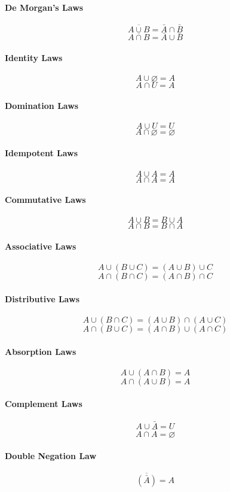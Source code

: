 \documentclass[a4paper, 10pt]{article}
\begin{document}
\begin{multicols}{2}
    \paragraph{De Morgan's Laws}
    \[ \overline{A\cup B} = \bar{A}\cap\bar{B} \]
    \[ \overline{A\cap B} = \bar{A}\cup\bar{B} \]

    \paragraph{Identity Laws}
    \[ A\cup\varnothing = A \]
    \[ A\cap U = A \]

    \paragraph{Domination Laws}
    \[ A\cup U = U \]
    \[ A\cap\varnothing = \varnothing \]

    \paragraph{Idempotent Laws}
    \[ A\cup A = A \]
    \[ A\cap A = A \]

    \paragraph{Commutative Laws}
    \[ A\cup B = B\cup A \]
    \[ A\cap B = B\cap A \]

    \paragraph{Associative Laws}
    \[ A\cup(B\cup C) = (A\cup B)\cup C \]
    \[ A\cap(B\cap C) = (A\cap B)\cap C \]

    \paragraph{Distributive Laws}
    \[ A\cup(B\cap C) = (A\cup B)\cap (A\cup C) \]
    \[ A\cap(B\cup C) = (A\cap B)\cup (A\cap C) \]

    \paragraph{Absorption Laws}
    \[ A\cup(A\cap B) = A \]
    \[ A\cap(A\cup B) = A \]

    \paragraph{Complement Laws}
    \[ A\cup\bar{A} = U \]
    \[ A\cap\bar{A} = \varnothing \]

    \paragraph{Double Negation Law}
    \[ \overline{\left(\bar{A}\right)} = A \]

\end{multicols}
\end{document}
